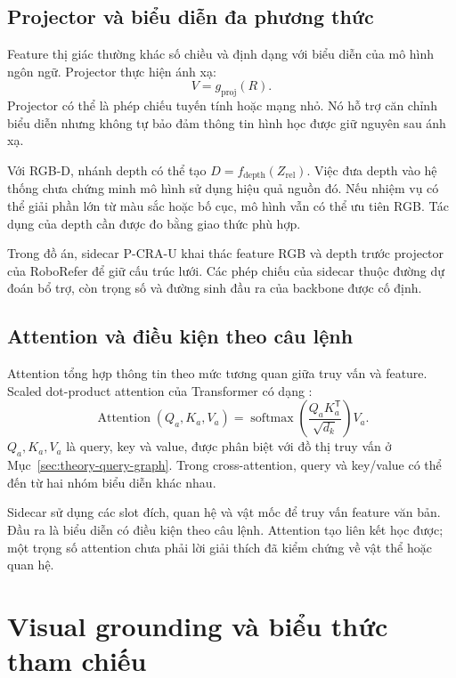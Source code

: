 \subsection{Projector và biểu diễn đa phương thức}

Feature thị giác thường khác số chiều và định dạng với biểu diễn của mô hình ngôn ngữ. Projector thực hiện ánh xạ:
\begin{equation}
    V=g_{\mathrm{proj}}(R).
    \label{eq:theory-projector}
\end{equation}
Projector có thể là phép chiếu tuyến tính hoặc mạng nhỏ. Nó hỗ trợ căn chỉnh biểu diễn nhưng không tự bảo đảm thông tin hình học được giữ nguyên sau ánh xạ.

Với RGB-D, nhánh depth có thể tạo $D=f_{\mathrm{depth}}(Z_{\mathrm{rel}})$. Việc đưa depth vào hệ thống chưa chứng minh mô hình sử dụng hiệu quả nguồn đó. Nếu nhiệm vụ có thể giải phần lớn từ màu sắc hoặc bố cục, mô hình vẫn có thể ưu tiên RGB. Tác dụng của depth cần được đo bằng giao thức phù hợp.

Trong đồ án, sidecar P-CRA-U khai thác feature RGB và depth trước projector của RoboRefer để giữ cấu trúc lưới. Các phép chiếu của sidecar thuộc đường dự đoán bổ trợ, còn trọng số và đường sinh đầu ra của backbone được cố định.

\subsection{Attention và điều kiện theo câu lệnh}

Attention tổng hợp thông tin theo mức tương quan giữa truy vấn và feature. Scaled dot-product attention của Transformer có dạng \cite{vaswani2017attention}:
\begin{equation}
    \operatorname{Attention}(Q_a,K_a,V_a)=
    \operatorname{softmax}\left(\frac{Q_aK_a^{\mathsf T}}{\sqrt{d_k}}\right)V_a.
    \label{eq:theory-attention}
\end{equation}
$Q_a,K_a,V_a$ là query, key và value, được phân biệt với đồ thị truy vấn ở Mục~\ref{sec:theory-query-graph}. Trong cross-attention, query và key/value có thể đến từ hai nhóm biểu diễn khác nhau.

Sidecar sử dụng các slot đích, quan hệ và vật mốc để truy vấn feature văn bản. Đầu ra là biểu diễn có điều kiện theo câu lệnh. Attention tạo liên kết học được; một trọng số attention chưa phải lời giải thích đã kiểm chứng về vật thể hoặc quan hệ.

\section{Visual grounding và biểu thức tham chiếu}
\label{sec:theory-grounding}

